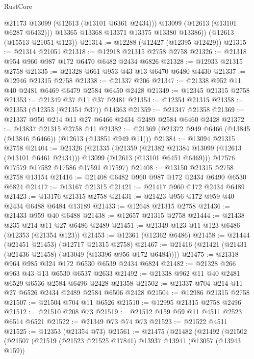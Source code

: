 \begin{lexlean}{RustCore}
\begin{coremodule}
            @21173
            @13099
            (@12613 (@13101 @6361 @2434)))
          @13099
          (@12613 (@13101 @6287 @6432)))
        @13365
        @13368
        @13371
        @13375
        @13380
        @13386))
    (@12613 (@15513 @21051 @123))
@21314 := @12288 (@12427 (@12395 @12429))
@21315 := @21314 @21051
@21318 := @12918 @21315 @2758 @2758
@21326 := @21318 @954 @960 @987 @172 @6470 @6482 @2434 @6826
@21328 := @12933 @21315 @2758
@21335 := @21328 @661 @953 @43 @13 @6470 @6480 @4430
@21337 := @12946 @21315 @2758
@21338 := @21337 @206
@21347 := @21338 @952 @11 @40 @2481 @6469 @6479 @2584 @6450 @2428
@21349 := @12345 @21315 @2758
@21353 := @21349 @37 @11 @37 @2481
@21354 := @12354 @21315
@21358 := @21353 (@12353 (@21354 @37)) @14363
@21359 := @21347 @21358
@21369 := @21337 @950 @214 @11 @27 @6466 @2434 @2489 @2584 @6460 @2428
@21372 := @13837 @21315 @2758 @11
@21382 := @21369 (@21372 @949 @6466 (@13845 (@13846 @6466)) (@12613 (@13851 @949 @11)))
@21384 := @13094 @21315 @2758
@21404 := @21326
    (@21335
      (@21359
        (@21382 @21384 @13099 (@12613 (@13101 @6461 @2434)))
        @13099
        (@12613 (@13101 @6451 @6469)))
      @17576
      @17579
      @17582
      @17586
      @17591
      @17597)
@21408 := @13150 @21315 @2758 @2758 @13154
@21416 := @21408 @6482 @960 @987 @172 @2434 @6490 @6530 @6824
@21417 := @13167 @21315
@21421 := @21417 @960 @172 @2434 @6489
@21423 := @13176 @21315 @2758
@21431 := @21423 @956 @172 @959 @40 @2434 @6488 @6484 @13189
@21433 := @12648 @21315 @2758
@21436 := @21433 @959 @40 @6488
@21438 := @12657 @21315 @2758
@21444 := @21438 @235 @214 @11 @27 @6486 @2489
@21451 := @21349 @123 @11 @123 @6486 (@12353 (@21354 @123))
@21453 := @12361 (@12362 @6486)
@21458 := @21444 (@21451 @21453) (@12717 @21315 @2758)
@21467 := @21416 (@21421 (@21431 (@21436 @21458) (@13049 (@13396 @956 @172 @6484))))
@21475 := @21318 @964 @985 @324 @172 @6530 @6539 @2434 @6824
@21482 := @21328 @266 @963 @43 @13 @6530 @6537 @2633
@21492 := @21338 @962 @11 @40 @2481 @6529 @6536 @2584 @6496 @2428 @21358
@21502 := @21337 @704 @214 @11 @27 @6526 @2434 @2489 @2584 @6506 @2428
@21504 := @12986 @21315 @2758
@21507 := @21504 @704 @11 @6526
@21510 := @12995 @21315 @2758 @2496
@21512 := @21510 @208 @73
@21519 := @21512 @159 @59 @11 @4511 @2523 @6514 @6521
@21522 := @21349 @73 @74 @73
@21523 := @21522 @4511
@21525 := @12353 (@21354 @73)
@21561 := @21475
    (@21482
      (@21492
        (@21502
          (@21507
            (@21519
              (@21523 @21525 @17841)
              @13937
              @13941
              (@13057 (@13943 @159))

\end{coremodule}
\end{lexlean}
